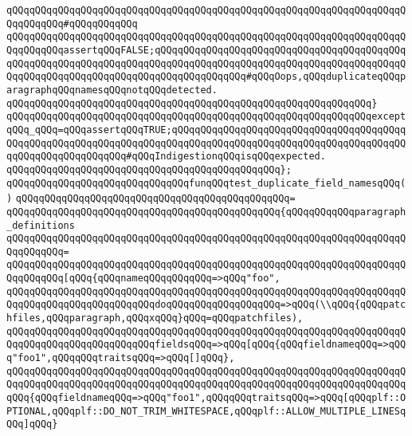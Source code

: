 \verb|qQQqqQQqqQQqqQQqqQQqqQQqqQQqqQQqqQQqqQQqqQQqqQQqqQQqqQQqqQQqqQQqqQQqqQQqqQQqqQQq#qQQqqQQqqQQq|\newline
\verb|qQQqqQQqqQQqqQQqqQQqqQQqqQQqqQQqqQQqqQQqqQQqqQQqqQQqqQQqqQQqqQQqqQQqqQQqqQQqqQQqassertqQQqFALSE;qQQqqQQqqQQqqQQqqQQqqQQqqQQqqQQqqQQqqQQqqQQqqQQqqQQqqQQqqQQqqQQqqQQqqQQqqQQqqQQqqQQqqQQqqQQqqQQqqQQqqQQqqQQqqQQqqQQqqQQqqQQqqQQqqQQqqQQqqQQqqQQqqQQqqQQqqQQq#qQQqOops,qQQqduplicateqQQqparagraphqQQqnamesqQQqnotqQQqdetected.|\newline
\verb|qQQqqQQqqQQqqQQqqQQqqQQqqQQqqQQqqQQqqQQqqQQqqQQqqQQqqQQqqQQqqQQq}|\newline
\verb|qQQqqQQqqQQqqQQqqQQqqQQqqQQqqQQqqQQqqQQqqQQqqQQqqQQqqQQqqQQqqQQqexceptqQQq_qQQq=qQQqassertqQQqTRUE;qQQqqQQqqQQqqQQqqQQqqQQqqQQqqQQqqQQqqQQqqQQqqQQqqQQqqQQqqQQqqQQqqQQqqQQqqQQqqQQqqQQqqQQqqQQqqQQqqQQqqQQqqQQqqQQqqQQqqQQqqQQqqQQqqQQq#qQQqIndigestionqQQqisqQQqexpected.|\newline
\verb|qQQqqQQqqQQqqQQqqQQqqQQqqQQqqQQqqQQqqQQqqQQqqQQq};|\newline
\newline
\verb|qQQqqQQqqQQqqQQqqQQqqQQqqQQqqQQqfunqQQqtest_duplicate_field_namesqQQq()|\newline
\verb|qQQqqQQqqQQqqQQqqQQqqQQqqQQqqQQqqQQqqQQqqQQqqQQq=|\newline
\verb|qQQqqQQqqQQqqQQqqQQqqQQqqQQqqQQqqQQqqQQqqQQqqQQq{qQQqqQQqqQQqparagraph_definitions|\newline
\verb|qQQqqQQqqQQqqQQqqQQqqQQqqQQqqQQqqQQqqQQqqQQqqQQqqQQqqQQqqQQqqQQqqQQqqQQqqQQqqQQq=|\newline
\verb|qQQqqQQqqQQqqQQqqQQqqQQqqQQqqQQqqQQqqQQqqQQqqQQqqQQqqQQqqQQqqQQqqQQqqQQqqQQqqQQq[qQQq{qQQqnameqQQqqQQqqQQq=>qQQq"foo",|\newline
\verb|qQQqqQQqqQQqqQQqqQQqqQQqqQQqqQQqqQQqqQQqqQQqqQQqqQQqqQQqqQQqqQQqqQQqqQQqqQQqqQQqqQQqqQQqqQQqqQQqdoqQQqqQQqqQQqqQQqqQQq=>qQQq(\\qQQq{qQQqpatchfiles,qQQqparagraph,qQQqxqQQq}qQQq=qQQqpatchfiles),|\newline
\verb|qQQqqQQqqQQqqQQqqQQqqQQqqQQqqQQqqQQqqQQqqQQqqQQqqQQqqQQqqQQqqQQqqQQqqQQqqQQqqQQqqQQqqQQqqQQqqQQqfieldsqQQq=>qQQq[qQQq{qQQqfieldnameqQQq=>qQQq"foo1",qQQqqQQqtraitsqQQq=>qQQq[]qQQq},|\newline
\verb|qQQqqQQqqQQqqQQqqQQqqQQqqQQqqQQqqQQqqQQqqQQqqQQqqQQqqQQqqQQqqQQqqQQqqQQqqQQqqQQqqQQqqQQqqQQqqQQqqQQqqQQqqQQqqQQqqQQqqQQqqQQqqQQqqQQqqQQqqQQqqQQq{qQQqfieldnameqQQq=>qQQq"foo1",qQQqqQQqtraitsqQQq=>qQQq[qQQqplf::OPTIONAL,qQQqplf::DO_NOT_TRIM_WHITESPACE,qQQqplf::ALLOW_MULTIPLE_LINESqQQq]qQQq}|\newline
